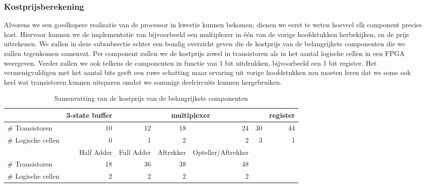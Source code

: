 \subsubsection{Kostprijsberekening}
Alvorens we een goedkopere realisatie van de processor in kwestie kunnen bekomen, dienen we eerst te weten hoeveel elk component precies kost. Hiervoor kunnen we de implementatie van bijvoorbeeld een multiplexer in \'e\'en van de vorige hoofdstukken herbekijken, en de prijs uitrekenen. We zullen in deze subsubsectie echter een bondig overzicht geven die de kostprijs van de belangrijkste componenten die we zullen tegenkomen samenvat. Per component zullen we de kostprijs zowel in transistoren als in het aantal logische cellen in een FPGA weergeven. Verder zullen we ook telkens de componenten in functie van 1 bit uitdrukken, bijvoorbeeld een 1 bit register. Het vermenigvuldigen met het aantal bits geeft een ruwe schatting maar ervaring uit vorige hoofdstukken zou moeten leren dat we soms ook heel wat transistoren kunnen uitsparen omdat we sommige deelcircuits kunnen hergebruiken.
\begin{table}[hbt]
\centering
\begin{tabular}{lrrrrrr}
\toprule
&3-state buffer&\multicolumn{4}{c}{multiplexer}&register\\
\midrule
\# Transistoren&10&12&18&24&30&44\\
\# Logische cellen&0&1&2&2&3&1\\
\bottomrule
\toprule
&Half Adder&Full Adder&Aftrekker&Opteller/Aftrekker\\
\midrule
\# Transistoren&18&36&38&48\\
\# Logische cellen&2&2&2&2\\
\end{tabular}
\caption{Samenvatting van de kostprijs van de belangrijkste componenten}
\label{tbl:costComponentsProcessor}
\end{table}
